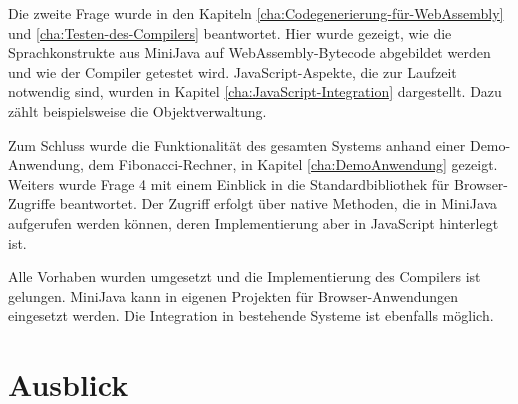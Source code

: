 Die zweite Frage wurde in den Kapiteln \ref{cha:Codegenerierung-für-WebAssembly} und \ref{cha:Testen-des-Compilers} beantwortet. Hier wurde gezeigt, wie die Sprachkonstrukte aus MiniJava auf WebAssembly-Bytecode abgebildet werden und wie der Compiler getestet wird. JavaScript-Aspekte, die zur Laufzeit notwendig sind, wurden in Kapitel \ref{cha:JavaScript-Integration} dargestellt. Dazu zählt beispielsweise die Objektverwaltung.

Zum Schluss wurde die Funktionalität des gesamten Systems anhand einer Demo-Anwendung, dem Fibonacci-Rechner, in Kapitel \ref{cha:DemoAnwendung} gezeigt. Weiters wurde Frage 4 mit einem Einblick in die Standardbibliothek für Browser-Zugriffe beantwortet. Der Zugriff erfolgt über native Methoden, die in MiniJava aufgerufen werden können, deren Implementierung aber in JavaScript hinterlegt ist.

Alle Vorhaben wurden umgesetzt und die Implementierung des Compilers ist gelungen. MiniJava kann in eigenen Projekten für Browser-Anwendungen eingesetzt werden. Die Integration in bestehende Systeme ist ebenfalls möglich.

\section{Ausblick}

